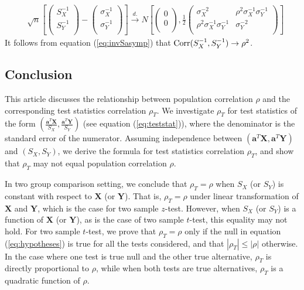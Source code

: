 	\begin{equation}\label{eq:invSasymp}
	\begin{aligned}
	& \sqrt{n}\left[\left( \begin{array}{c}
	S_X^{-1}\\
	S_Y^{-1}\\
	\end{array}\right)
	-
	\left( \begin{array}{c}
	\sigma_X^{-1}\\
	\sigma_Y^{-1}\\
	\end{array}\right)
	\right]
	\stackrel{d.}{\longrightarrow} 
	N\left[
	\left(\begin{array}{c}
	0\\
	0\\
	\end{array} \right), 
	\frac{1}{2}\left(
	\begin{array}{cc}
	\sigma_X^{-2} &\rho^2\sigma_X^{-1}\sigma_Y^{-1} \\
	\rho^2\sigma_X^{-1}\sigma_Y^{-1}  &\sigma_Y^{-2} \\
	\end{array}
	\right)
	\right] 
	\end{aligned}
	\end{equation}
	It follows from equation (\ref{eq:invSasymp}) that $\text{Corr}(S_X^{-1}, S_Y^{-1}) \rightarrow 
	\rho^2$.
	
	
	
	\subsection{Conclusion}
	
	This article discusses the relationship between population correlation $\rho$ and the 
	corresponding test statistics correlation $\rho_T$. We investigate $\rho_T$ for test statistics 
	of the form $(\frac{\bm a^T\bm X}{S_X}, \frac{\bm a^T\bm Y}{S_Y})$ (see equation 
	(\ref{eq:teststat})), where the denominator is the standard error of the numerator. Assuming 
	independence between $(\bm a^T\bm X, \bm a^T\bm Y)$ and $(S_X, S_Y)$, we derive the formula for 
	test statistics correlation $\rho_T$, and show that $\rho_T$ may not equal population 
	correlation $\rho$.  
	
	In two group comparison setting, we conclude that $\rho_T = \rho$ when $S_X$ (or $S_Y$) is 
	constant with respect to $\bm X$ (or $\bm Y$). That is, $\rho_T = \rho$ under linear 
	transformation of $\bm X$ and $\bm Y$, which is the case for two sample $z$-test. However, when 
	$S_X$ (or $S_Y$) is a function of $\bm X$ (or $\bm Y$), as is the case of two
	sample $t$-test, this equality may not hold. For two sample $t$-test, we prove that 
	$\rho_T=\rho$ only if the null in equation (\ref{eq:hypotheses}) is true for all the tests 
	considered, and that $|\rho_T|\leq |\rho|$ otherwise. In the case where one test is true null 
	and the other true alternative, $\rho_T$ is directly proportional to $\rho$, while when both 
	tests are true alternatives, $\rho_T$ is a quadratic function of $\rho$.
	
